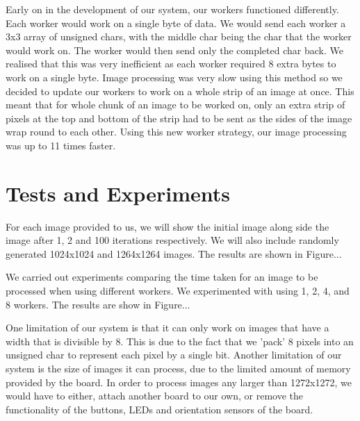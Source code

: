 \documentclass{article}
\begin{document}
\begin{multicols}{2}
\vspace{5mm}

Early on in the development of our system, our workers functioned differently. Each worker would work
on a single byte of data. We would send each worker a 3x3 array of unsigned chars, with the middle 
char being the char that the worker would work on. The worker would then send only the completed
char back. We realised that this was very inefficient as each worker required 8 extra bytes to work
on a single byte. Image processing was very slow using this method so we decided to update
our workers to work on a whole strip of an image at once. This meant that for whole chunk of an image
to be worked on, only an extra strip of pixels at the top and bottom of the strip had to be sent as
the sides of the image wrap round to each other. Using this new worker strategy, our image processing
was up to 11 times faster.

\section{Tests and Experiments}
For each image provided to us, we will show the initial image along side the image after 1, 2 and 100
iterations respectively. We will also include randomly generated 1024x1024 and 1264x1264 images. The
results are shown in Figure...

\vspace{5mm}

We carried out experiments comparing the time taken for an image to be processed when using different
workers. We experimented with using 1, 2, 4, and 8 workers. The results are show in Figure... 

\vspace{5mm}

One limitation of our system is that it can only work on images that have a width that is divisible by
8. This is due to the fact that we 'pack' 8 pixels into an unsigned char to represent each pixel by
a single bit. Another limitation of our system is the size of images it can process, due to the limited
amount of memory provided by the board. In order to process images any larger than 1272x1272, we would
have to either, attach another board to our own, or remove the functionality of the buttons, LEDs and
orientation sensors of the board.

\end{multicols}

\newpage
\end{document}

